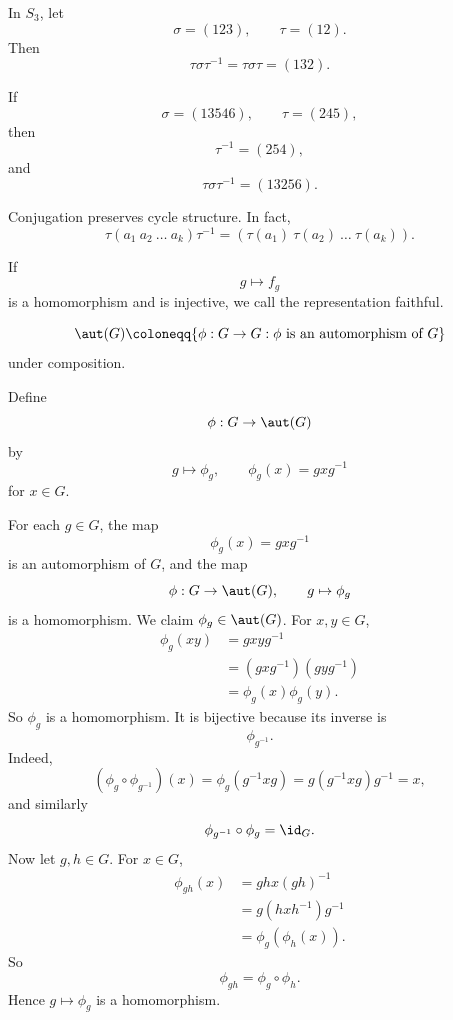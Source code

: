 \begin{example}
    In $S_3$, let
    \[
        \sigma=(123),
        \qquad
        \tau=(12).
    \]
    Then
    \[
        \tau\sigma\tau^{-1}=\tau\sigma\tau=(132).
    \]
\end{example}

\begin{example}
    If
    \[
        \sigma=(13546),
        \qquad
        \tau=(245),
    \]
    then
    \[
        \tau^{-1}=(254),
    \]
    and
    \[
        \tau\sigma\tau^{-1}=(13256).
    \]
\end{example}

Conjugation preserves cycle structure.
In fact,
\[
    \tau(a_1\ a_2\ \dots\ a_k)\tau^{-1}
    =
    (\tau(a_1)\ \tau(a_2)\ \dots\ \tau(a_k)).
\]

\begin{definition}[Faithful]
    If
    \[
        g\mapsto f_g
    \]
    is a homomorphism and is injective, we call the representation faithful.
\end{definition}

\begin{definition}
    \[
        \aut(G)\coloneqq \{\phi:G\to G:\phi\text{ is an automorphism of }G\}
    \]
    under composition.
\end{definition}

\begin{example}
    Define
    \[
        \phi:G\to \aut(G)
    \]
    by
    \[
        g\mapsto \phi_g,
        \qquad
        \phi_g(x)=gxg^{-1}
    \]
    for $x\in G$.
\end{example}

\begin{proposition}{
    For each $g\in G$, the map
    \[
        \phi_g(x)=gxg^{-1}
    \]
    is an automorphism of $G$, and the map
    \[
        \phi:G\to \aut(G),
        \qquad
        g\mapsto \phi_g
    \]
    is a homomorphism.
}
    We claim $\phi_g\in \aut(G)$.
    For $x,y\in G$,
    \begin{align*}
        \phi_g(xy)
        &=
        gxyg^{-1}\\
        &=
        (gxg^{-1})(gyg^{-1})\\
        &=
        \phi_g(x)\phi_g(y).
    \end{align*}
    So $\phi_g$ is a homomorphism.
    It is bijective because its inverse is
    \[
        \phi_{g^{-1}}.
    \]
    Indeed,
    \[
        (\phi_g\circ \phi_{g^{-1}})(x)
        =
        \phi_g(g^{-1}xg)
        =
        g(g^{-1}xg)g^{-1}
        =
        x,
    \]
    and similarly
    \[
        \phi_{g^{-1}}\circ \phi_g=\id_G.
    \]
    Now let $g,h\in G$.
    For $x\in G$,
    \begin{align*}
        \phi_{gh}(x)
        &=
        ghx(gh)^{-1}\\
        &=
        g(hxh^{-1})g^{-1}\\
        &=
        \phi_g(\phi_h(x)).
    \end{align*}
    So
    \[
        \phi_{gh}=\phi_g\circ \phi_h.
    \]
    Hence $g\mapsto \phi_g$ is a homomorphism.
\end{proposition}

